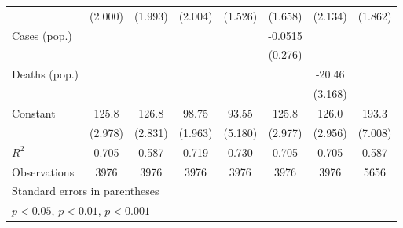 \documentclass{article}
\begin{document}
{\begin{longtable}{l*{7}{c}}
                &  (2.000)         &  (1.993)         &  (2.004)         &  (1.526)         &  (1.658)         &  (2.134)         &  (1.862)         \\
Cases (pop.)    &                  &                  &                  &                  &  -0.0515         &                  &                  \\
                &                  &                  &                  &                  &  (0.276)         &                  &                  \\
Deaths (pop.)   &                  &                  &                  &                  &                  &   -20.46\sym{***}&                  \\
                &                  &                  &                  &                  &                  &  (3.168)         &                  \\
Constant        &    125.8\sym{***}&    126.8\sym{***}&    98.75\sym{***}&    93.55\sym{***}&    125.8\sym{***}&    126.0\sym{***}&    193.3\sym{***}\\
                &  (2.978)         &  (2.831)         &  (1.963)         &  (5.180)         &  (2.977)         &  (2.956)         &  (7.008)         \\
\hline
\(R^{2}\)       &    0.705         &    0.587         &    0.719         &    0.730         &    0.705         &    0.705         &    0.587         \\
Observations    &     3976         &     3976         &     3976         &     3976         &     3976         &     3976         &     5656         \\
\hline\hline
\multicolumn{8}{l}{\footnotesize Standard errors in parentheses}\\
\multicolumn{8}{l}{\footnotesize \sym{*} \(p<0.05\), \sym{**} \(p<0.01\), \sym{***} \(p<0.001\)}\\
\end{longtable}
}
\end{document}
